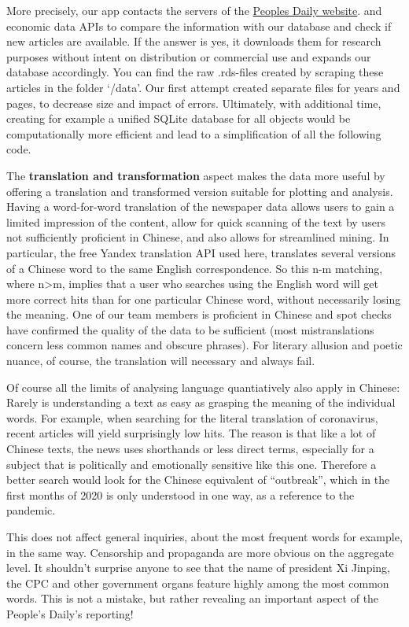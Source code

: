 \documentclass[12pt,a4paper]{article}
\begin{document}
More precisely, our app contacts the servers of the \href{http://paper.people.com.cn/rmrb}{Peoples Daily website}. and economic data APIs to compare the information with our database and check if new articles are available. If the answer is yes, it downloads them for research purposes without intent on distribution or commercial use and expands our database accordingly. You can find the raw .rds-files created by scraping these articles in the folder `/data'. Our first attempt created separate files for years and pages, to decrease size and impact of errors. Ultimately, with additional time, creating for example a unified SQLite database for all objects would be computationally more efficient and lead to a simplification of all the following code.

The \textbf{translation and transformation} aspect makes the data more useful by offering a translation and transformed version suitable for plotting and analysis. Having a word-for-word translation of the newspaper data allows users to gain a limited impression of the content, allow for quick scanning of the text by users not sufficiently proficient in Chinese, and also allows for streamlined mining. In particular, the free Yandex translation API used here, translates several versions of a Chinese word to the same English correspondence. So this n-m matching, where n\textgreater m, implies that a user who searches using the English word will get more correct hits than for one particular Chinese word, without necessarily losing the meaning. One of our team members is proficient in Chinese and spot checks have confirmed the quality of the data to be sufficient (most mistranslations concern less common names and obscure phrases). For literary allusion and poetic nuance, of course, the translation will necessary and always fail.

Of course all the limits of analysing language quantiatively also apply in Chinese: Rarely is understanding a text as easy as grasping the meaning of the individual words. For example, when searching for the literal translation of coronavirus, recent articles will yield surprisingly low hits. The reason is that like a lot of Chinese texts, the news uses shorthands or less direct terms, especially for a subject that is politically and emotionally sensitive like this one. Therefore a better search would look for the Chinese equivalent of ``outbreak'', which in the first months of 2020 is only understood in one way, as a reference to the pandemic.

This does not affect general inquiries, about the most frequent words for example, in the same way. Censorship and propaganda are more obvious on the aggregate level. It shouldn't surprise anyone to see that the name of president Xi Jinping, the CPC and other government organs feature highly among the most common words. This is not a mistake, but rather revealing an important aspect of the People's Daily's reporting!
\end{document}
